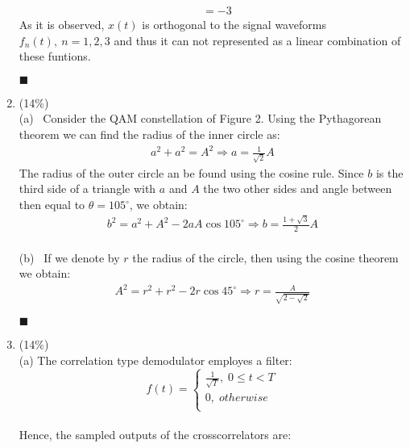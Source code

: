 \documentclass[a4paper,12pt]{article}
\begin{document}
\begin{enumerate}
\begin{align*}
                &= -3
        \end{align*}
        As it is observed, $x(t)$ is orthogonal to the signal waveforms $f_n(t),\ n=1,2,3$ and thus it can not represented as a linear combination of these funtions.
            \begin{flushright}
                $\blacksquare$
            \end{flushright}
        \item (14\%) \\
        (a) \ Consider the QAM constellation of Figure 2. Using the Pythagorean theorem we can find the radius of the inner circle as:
        \begin{align*}
            a^2+a^2=A^2\Longrightarrow a=\frac{1}{\sqrt{2}}A
        \end{align*}
        The radius of the outer circle an be found using the cosine rule. Since $b$ is the third side of a triangle with $a$ and $A$ the two other sides and angle between then equal to $\theta=105^\circ$, we obtain:
        \begin{align*}
            b^2=a^2+A^2-2aA\cos105^\circ\Longrightarrow b=\frac{1+\sqrt{3}}{2}A
        \end{align*}\\
        (b) \ If we denote by $r$ the radius of the circle, then using the cosine theorem we obtain:
        \begin{align*}
            A^2=r^2+r^2-2r\cos 45^\circ\Longrightarrow r=\frac{A}{\sqrt{2-\sqrt{2}}}
        \end{align*}
            \begin{flushright}
                $\blacksquare$
            \end{flushright}
        \item (14\%) \\ 
            (a) The correlation type demodulator employes a filter: \\ 
            $$f(t) = \left\{ 
            \begin{aligned}
                \frac{1}{\sqrt{T}}, \; 0 \leq t < T \\
                 0, \; otherwise \\ 
            \end{aligned}
            \right.
            $$ \\ 
            Hence, the sampled outputs of the crosscorrelators are: \\

\end{enumerate}
\end{document}

